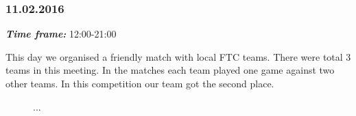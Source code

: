 \subsubsection{11.02.2016}
\textit{\textbf{Time frame:}} 12:00-21:00 

This day we organised a friendly match with local FTC teams. There were total 3 teams in this meeting. In the matches each team played one game against two other teams. In this competition our team got the second place. 

\begin{figure}[H]
	\begin{minipage}[h]{0.47\linewidth}
		\caption{...}
		\label{Shiftbuc2.8}
	\end{minipage}
	\hfill
	\begin{minipage}[h]{0.47\linewidth}
		\caption{...}
		\label{Shiftbuc2.8}
	\end{minipage}
\end{figure}
